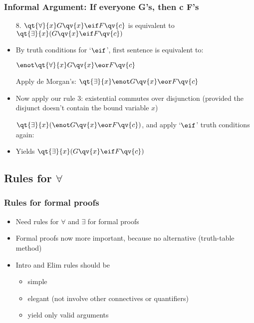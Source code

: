 \begin{frame}
\frametitle{Informal Argument: If everyone G's, then c F's}




\begin{itemize}[<+->]

\item[8.] $\qt{\forall}{x}G\qv{x} \eif F\qv{c}$ is equivalent to  $\qt{\exists}{x}(G\qv{x} \eif F\qv{c})$

\item By truth conditions for `$\eif$', first sentence is equivalent to:

\item[] $\enot \qt{\forall}{x}G\qv{x} \eor F\qv{c}$

\item[] Apply de Morgan's: $\qt{\exists}{x}\enot G\qv{x} \eor F\qv{c}$

\item Now apply our rule 3: existential commutes over disjunction (provided the disjunct doesn't contain the bound variable $x$)

\item[] $\qt{\exists}{x}(\enot G\qv{x} \eor F\qv{c})$, and apply `$\eif$' truth conditions again:

\item Yields $\qt{\exists}{x}(G\qv{x} \eif F\qv{c})$

\end{itemize}
\end{frame}




\subsection{Rules for $\forall$}

\begin{frame}
\frametitle{Rules for formal proofs}

\begin{itemize}[<+->]
\item Need rules for $\forall$ and $\exists$ for formal proofs
\item Formal proofs now more important, because no alternative
  (truth-table method)
\item Intro and Elim rules should be
\begin{itemize}[<+->]
\item simple
\item elegant (not involve other connectives or quantifiers)
\item yield only valid arguments
\end{itemize}
\end{itemize}

\end{frame}

